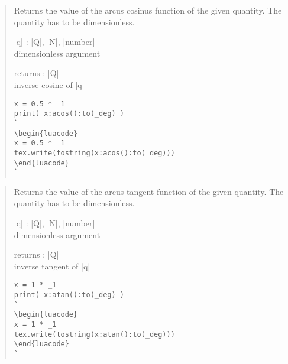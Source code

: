 \documentclass{ltxdoc}
\begin{document}
\begin{quote}
  Returns the value of the arcus cosinus function of the given quantity. The quantity has to be dimensionless.

  \begin{description}
  \item |q| : |Q|, |N|, |number|\\
    dimensionless argument

  \item returns : |Q|\\
    inverse cosine of |q|
  \end{description}

\begin{lstlisting}
x = 0.5 * _1
print( x:acos():to(_deg) )
`
\begin{luacode}
x = 0.5 * _1
tex.write(tostring(x:acos():to(_deg)))
\end{luacode}
`
\end{lstlisting}

\end{quote}




\begin{quote}
  Returns the value of the arcus tangent function of the given quantity. The quantity has to be dimensionless.

  \begin{description}
  \item |q| : |Q|, |N|, |number|\\
    dimensionless argument

  \item returns : |Q|\\
    inverse tangent of |q|
  \end{description}

\begin{lstlisting}
x = 1 * _1
print( x:atan():to(_deg) )
`
\begin{luacode}
x = 1 * _1
tex.write(tostring(x:atan():to(_deg)))
\end{luacode}
`
\end{lstlisting}

\end{quote}
\end{document}

